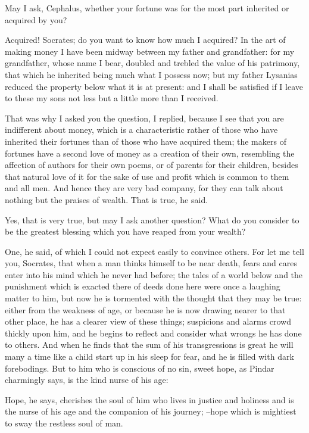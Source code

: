 May I ask, Cephalus, whether your fortune was for the most part inherited or acquired by you?

Acquired! Socrates; do you want to know how much I acquired? In the art of making money I have been midway between my father and grandfather: for my grandfather, whose name I bear, doubled and trebled the value of his patrimony, that which he inherited being much what I possess now; but my father Lysanias reduced the property below what it is at present: and I shall be satisfied if I leave to these my sons not less but a little more than I received.

That was why I asked you the question, I replied, because I see that you are indifferent about money, which is a characteristic rather of those who have inherited their fortunes than of those who have acquired them; the makers of fortunes have a second love of money as a creation of their own, resembling the affection of authors for their own poems, or of parents for their children, besides that natural love of it for the sake of use and profit which is common to them and all men. And hence they are very bad company, for they can talk about nothing but the praises of wealth. That is true, he said.

Yes, that is very true, but may I ask another question? What do you consider to be the greatest blessing which you have reaped from your wealth?

One, he said, of which I could not expect easily to convince others. For let me tell you, Socrates, that when a man thinks himself to be near death, fears and cares enter into his mind which he never had before; the tales of a world below and the punishment which is exacted there of deeds done here were once a laughing matter to him, but now he is tormented with the thought that they may be true: either from the weakness of age, or because he is now drawing nearer to that other place, he has a clearer view of these things; suspicions and alarms crowd thickly upon him, and he begins to reflect and consider what wrongs he has done to others. And when he finds that the sum of his transgressions is great he will many a time like a child start up in his sleep for fear, and he is filled with dark forebodings. But to him who is conscious of no sin, sweet hope, as Pindar charmingly says, is the kind nurse of his age:

Hope, he says, cherishes the soul of him who lives in justice and holiness and is the nurse of his age and the companion of his journey; --hope which is mightiest to sway the restless soul of man.

